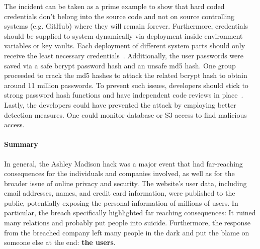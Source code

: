 \documentclass{homework}
\begin{document}
The incident can be taken as a prime example to show that hard coded credentials don't belong into the source code and not on source controlling systems (e.g. GitHub) where they will remain forever. Furthermore, credentials should be supplied to system dynamically via deployment inside environment variables or key vaults. Each deployment of different system parts should only receive the least necessary credentials~\cite{cwe}.
Additionally, the user passwords were saved via a safe bcrypt password hash and an unsafe md5 hash. One group proceeded to crack the md5 hashes to attack the related bcrypt hash to obtain around 11 million passwords. To prevent such issues, developers should stick to strong password hash functions and have independent code reviews in place~\cite{security2}.
Lastly, the developers could have prevented the attack by employing better detection measures. One could monitor database or S3 access to find malicious access.
\paragraph{\textbf{Summary}}
In general, the Ashley Madison hack was a major event that had far-reaching consequences for the individuals and companies involved, as well as for the broader issue of online privacy and security. The website's user data, including email addresses, names, and credit card information, were published to the public, potentially exposing the personal information of millions of users. In particular, the breach specifically highlighted far reaching consequences: It ruined many relations and probably put people into suicide. Furthermore, the response from the breached company left many people in the dark and put the blame on someone else at the end: \textbf{the users}.



\end{document}
